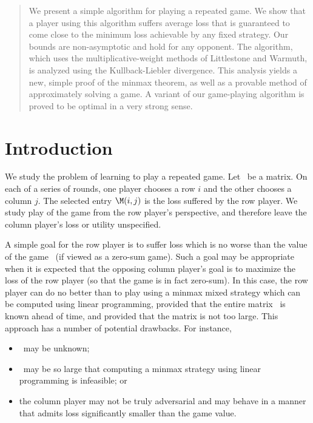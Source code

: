 \begin{abstract}

We present a simple algorithm for playing a repeated game.  We show
that a player using this algorithm suffers average loss that is
guaranteed to come close to the minimum loss achievable by any fixed
strategy.  Our bounds are non-asymptotic and hold for any opponent.
The algorithm, which uses the multiplicative-weight methods of
Littlestone and Warmuth, is analyzed using the Kullback-Liebler
divergence.  This analysis yields a new, simple proof of the minmax
theorem, as well as a provable method of approximately solving a game.
A variant of our game-playing algorithm is proved to be optimal in a
very strong sense.

\end{abstract}


\section{Introduction} \label{sec:intro}

We study the problem of learning to play a repeated game.
Let \M\ be a matrix.
On each of a series of rounds, one player chooses a row $i$ and the
other chooses a column $j$.
The selected entry $\M(i,j)$ is the loss suffered by the row player.
We study play of the game from the row player's perspective, and
therefore leave the column player's loss or utility unspecified.

A simple goal for the row player is to suffer loss which is no worse
than the value of the game \M\ (if viewed as a zero-sum game).
Such a goal may be appropriate when it is expected that the opposing
column player's
goal is to maximize the loss of the row player (so that the game is in
fact zero-sum).
In this case, the row player can do no better than to play using a
minmax mixed strategy which can be computed using linear programming,
provided that the entire
matrix \M\ is known ahead of time, and provided that the matrix is not
too large.
This approach has a number of potential drawbacks.
For instance,
\begin{itemize}
\item
\M\ may be unknown;
\item
\M\ may be so large that computing a minmax strategy using linear
programming is infeasible; or
\item
the column player may not be truly adversarial and may behave in a
manner that admits loss significantly smaller than the game value.
\end{itemize}

